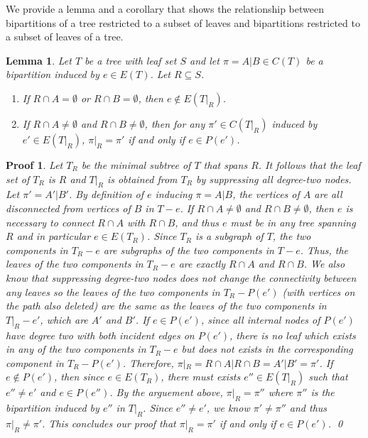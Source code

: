 \documentclass{bmcart}
\theoremstyle{mystyle}
\newtheorem{lemma}{Lemma}
\theoremstyle{proofstyle}
\newtheorem*{proof2}{Proof}
\newenvironment{proofnospace}{\begin{proof2}}{\qed \end{proof2}}
\begin{document}
We provide a lemma and a corollary that shows the relationship between bipartitions of a tree restricted to a subset of leaves and bipartitions restricted to a subset of leaves of a tree. 
\begin{lemma} \label{lem:bipar_restrict_edge}
    Let $T$ be a tree with leaf set $S$ and let $\pi = A|B \in C(T)$ be a bipartition induced by $e \in E(T)$. Let $R \subseteq S$.
    \begin{enumerate}
        \item If $R \cap A = \emptyset$ or $R \cap B = \emptyset$, then $e \notin E(T|_R)$.
        \item If $R \cap A \neq \emptyset$ and $R \cap B \neq \emptyset$, then for any $\pi' \in C(T|_R)$ induced by $e' \in E(T|_R)$, $\pi|_R = \pi'$ if and only if $e \in P(e')$.
    \end{enumerate}
\end{lemma}
\begin{proofnospace}
Let $T_R$ be the minimal subtree of $T$ that spans $R$. It follows that the leaf set of $T_R$ is $R$ and $T|_R$ is obtained from $T_R$ by suppressing all degree-two nodes. Let $\pi' = A'|B'$. By definition of $e$ inducing $\pi = A|B$, the vertices of $A$ are all disconnected from vertices of $B$ in $T-e$. If $R\cap A \neq \emptyset$ and $R\cap B \neq \emptyset$, then $e$ is necessary to connect $R\cap A$ with $R \cap B$, and thus $e$ must be in any tree spanning $R$ and in particular $e \in E(T_R)$. Since $T_R$ is a subgraph of $T$, the two components in $T_R-e$ are subgraphs of the two components in $T-e$. Thus, the leaves of the two components in $T_R-e$ are exactly $R\cap A$ and $R\cap B$. We also know that suppressing degree-two nodes does not change the connectivity between any leaves so the leaves of the two components in $T_R - P(e')$ (with vertices on the path also deleted) are the same as the leaves of the two components in $T|_R - e'$, which are $A'$ and $B'$. If $e \in P(e')$, since all internal nodes of $P(e')$ have degree two with both incident edges on $P(e')$, there is no leaf which exists in any of the two components in $T_R - e$ but does not exists in the corresponding component in $T_R-P(e')$. Therefore, $\pi|_R = R\cap A|R\cap B = A'|B' = \pi'$. If $e \notin P(e')$, then since $e \in E(T_R)$, there must exists $e'' \in E(T|_R)$ such that $e'' \neq e'$ and $e \in P(e'')$. By the arguement above, $\pi|_R = \pi''$ where $\pi''$ is the bipartition induced by $e''$ in $T|_R$. Since $e'' \neq e'$, we know $\pi' \neq \pi''$ and thus $\pi|_R \neq \pi'$. This concludes our proof that $\pi|_R = \pi'$ if and only if $e \in P(e')$. 
\end{proofnospace}
\end{document}
